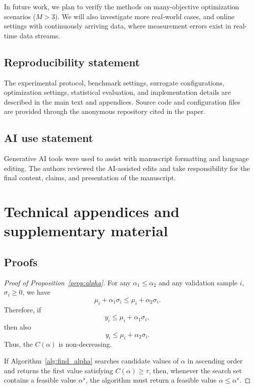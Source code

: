 \documentclass{article}
\begin{document}
In future work, we plan to verify the methods on many-objective optimization scenarios ($M > 3$). We will also investigate more real-world cases, and online settings with continuously arriving data, where measurement errors exist in real-time data streams.


\subsection*{Reproducibility statement}
The experimental protocol, benchmark settings, surrogate configurations, optimization settings, statistical evaluation, and implementation details are described in the main text and appendices. Source code and configuration files are provided through the anonymous repository cited in the paper.

\subsection*{AI use statement}
Generative AI tools were used to assist with manuscript formatting and language editing. The authors reviewed the AI-assisted edits and take responsibility for the final content, claims, and presentation of the manuscript.






\appendix

\section{Technical appendices and supplementary material}

\subsection{Proofs}

\begin{proof}[Proof of Proposition~\ref{prop:alpha}]
For any $\alpha_1 \le \alpha_2$ and any validation sample $i$, $\sigma_i \ge 0$, we have
\[
\mu_i + \alpha_1 \sigma_i \le \mu_i + \alpha_2 \sigma_i .
\]
Therefore, if 
\[
y_i \le \mu_i + \alpha_1 \sigma_i,
\]
then also
\[
y_i \le \mu_i + \alpha_2 \sigma_i.
\]
Thus, the $C(\alpha)$ is non-decreasing.

If Algorithm~\ref{alg:find_alpha} searches candidate values of $\alpha$ in 
ascending order and returns the first value satisfying $C(\alpha)\ge \tau$, 
then, whenever the search set contains a feasible value $\alpha^\star$, the 
algorithm must return a feasible value $\alpha \le \alpha^\star$.
\end{proof}
\end{document}
